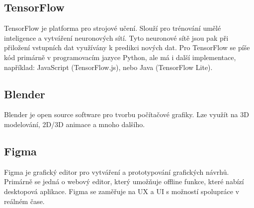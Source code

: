 \subsection{TensorFlow}
TensorFlow je platforma pro strojové učení. Slouží pro trénování umělé inteligence a vytváření neuronových sítí. Tyto neuronové sítě jsou pak při přiložení vstupních dat využívány k predikci nových dat. Pro TensorFlow se píše kód primárně v programovacím jazyce Python, ale má i další implementace, například: JavaScript (TensorFlow.js), nebo Java (TensorFlow Lite).

\subsection{Blender}
Blender je open source software pro tvorbu počítačové grafiky. Lze využít na 3D modelování, 2D/3D animace a mnoho dalšího.

\subsection{Figma}
Figma je grafický editor pro vytváření a prototypování grafických návrhů. Primárně se jedná o webový editor, který umožňuje offline funkce, které nabízí desktopová aplikace. Figma se zaměřuje na UX a UI s možností spolupráce v reálném čase.


